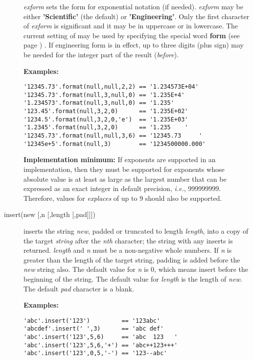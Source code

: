 \begin{description}
\emph{exform} sets the form for exponential notation (if needed).
\emph{exform} may be either \textbf{'Scientific'} (the default)
or \textbf{'Engineering'}.  Only the first character of
\emph{exform} is significant and it may be in uppercase or in
lowercase.
The current setting of  may be used by specifying
the special word  \textbf{form} (see page \pageref{refswform}) .
If engineering form is in effect, up to three digits (plus sign) may be
needed for the integer part of the result (\emph{before}).
 
\textbf{Examples:}
\begin{lstlisting}
'12345.73'.format(null,null,2,2) == '1.234573E+04'
'12345.73'.format(null,3,null,0) == '1.235E+4'
'1.234573'.format(null,3,null,0) == '1.235'
'123.45'.format(null,3,2,0)      == '1.235E+02'
'1234.5'.format(null,3,2,0,'e')  == '1.235E+03'
'1.2345'.format(null,3,2,0)      == '1.235    '
'12345.73'.format(null,null,3,6) == '12345.73     '
'12345e+5'.format(null,3)        == '1234500000.000'
\end{lstlisting}
 \textbf{Implementation minimum:} If exponents are supported in an
implementation, then they must be supported for exponents whose
absolute value is at least as large as the largest number that can be
expressed as an exact integer in default precision, \emph{i.e.}, 999999999.
Therefore, values for \emph{explaces} of up to 9 should also be
supported.
\item[insert(new [,n [,length [,pad{]]]})]\label{refinsert}

inserts the string \emph{new}, padded or truncated to length
\emph{length}, into a copy of the target \emph{string} after the
\emph{n}\emph{th} character; the string with any inserts is returned.
\emph{length} and \emph{n} must be a non-negative whole numbers.
If \emph{n} is greater than the length of the target string,
padding is added before the \emph{new} string also.
The default value for \emph{n} is 0, which means insert before the
beginning of the string.  The default value for \emph{length} is
the length of \emph{new}.  The default \emph{pad} character is
a blank.
 
\textbf{Examples:}
\begin{lstlisting}
'abc'.insert('123')         == '123abc'
'abcdef'.insert(' ',3)      == 'abc def'
'abc'.insert('123',5,6)     == 'abc  123   '
'abc'.insert('123',5,6,'+') == 'abc++123+++'
'abc'.insert('123',0,5,'-') == '123--abc'
\end{lstlisting}


\end{description}
